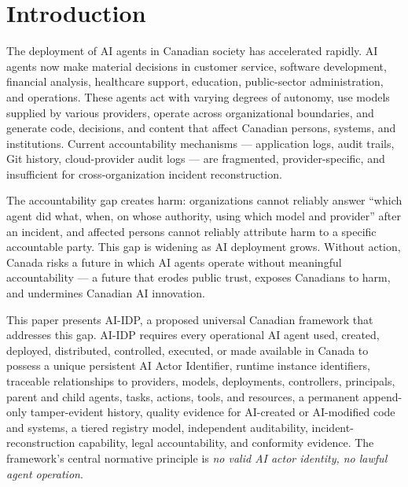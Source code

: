 \documentclass[11pt,a4paper]{article}
\begin{document}
\section{Introduction}
\label{sec:introduction}

The deployment of AI agents in Canadian society has accelerated rapidly. AI agents now make material decisions in customer service, software development, financial analysis, healthcare support, education, public-sector administration, and operations. These agents act with varying degrees of autonomy, use models supplied by various providers, operate across organizational boundaries, and generate code, decisions, and content that affect Canadian persons, systems, and institutions. Current accountability mechanisms --- application logs, audit trails, Git history, cloud-provider audit logs --- are fragmented, provider-specific, and insufficient for cross-organization incident reconstruction.

The accountability gap creates harm: organizations cannot reliably answer ``which agent did what, when, on whose authority, using which model and provider'' after an incident, and affected persons cannot reliably attribute harm to a specific accountable party. This gap is widening as AI deployment grows. Without action, Canada risks a future in which AI agents operate without meaningful accountability --- a future that erodes public trust, exposes Canadians to harm, and undermines Canadian AI innovation.

This paper presents AI-IDP, a proposed universal Canadian framework that addresses this gap. AI-IDP requires every operational AI agent used, created, deployed, distributed, controlled, executed, or made available in Canada to possess a unique persistent AI Actor Identifier, runtime instance identifiers, traceable relationships to providers, models, deployments, controllers, principals, parent and child agents, tasks, actions, tools, and resources, a permanent append-only tamper-evident history, quality evidence for AI-created or AI-modified code and systems, a tiered registry model, independent auditability, incident-reconstruction capability, legal accountability, and conformity evidence. The framework's central normative principle is \textit{no valid AI actor identity, no lawful agent operation}.
\end{document}
